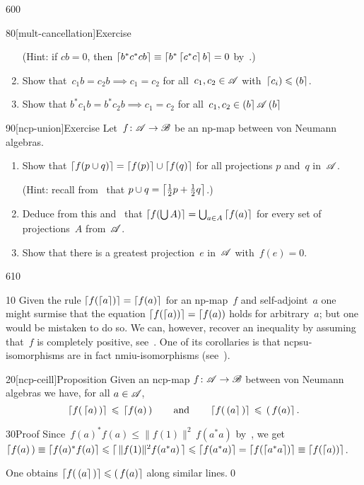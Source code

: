 \begin{parsec}{600}
\begin{point}{80}[mult-cancellation]{Exercise}
\begin{enumerate}
(Hint: if $cb=0$,
then $\left\lceil b^*c^*cb\right\rceil\equiv \left\lceil b^*\left\lceil c^*c\right\rceil b\right\rceil=0$
by~.)
\item
Show that~$c_1b=c_2b \implies c_1=c_2$
for all~$c_1,c_2\in\mathscr{A}$
with~$\left\lceil c_i\right)\leqslant \left(b\right\rceil$.
\item
Show that $b^*c_1b=b^*c_2b\implies c_1=c_2$
for all~$c_1,c_2\in\left(b\right\rceil\mathscr{A}\left(b\right\rceil$
\end{enumerate}
\end{point}
\begin{point}{90}[ncp-union]{Exercise}%
Let~$f\colon \mathscr{A}\to\mathscr{B}$ be an np-map
between von Neumann algebras.
\begin{enumerate}
\item
Show that
$\left\lceil f(p\cup q)\right\rceil
= \left\lceil f(p)\right\rceil\cup\left\lceil f(q)\right\rceil$
for all projections $p$ and~$q$ in~$\mathscr{A}$.

(Hint: recall from~ 
that $p\cup q = \left\lceil\frac{1}{2}p+\frac{1}{2}q\right\rceil$.)

\item
Deduce from this and~ that $\left\lceil f(\bigcup A)\right\rceil=\bigcup_{a\in A}\left\lceil f(a)\right\rceil$
for every set of projections~$A$ from~$\mathscr{A}$.

\item
Show that there is a greatest projection~$e$
in~$\mathscr{A}$ with~$f(e)=0$.
\end{enumerate}
\end{point}
\end{parsec}
\begin{parsec}{610}%
\begin{point}{10}%
Given the rule $\left\lceil f(\left\lceil a\right\rceil)\right\rceil=\left\lceil f(a)\right\rceil$
for an np-map~$f$ and self-adjoint~$a$
one might surmise that
the equation $\left\lceil f(\left\lceil a\right))\right\rceil=\left\lceil f(a)\right)$
holds 
for arbitrary~$a$;
but
one would be mistaken to do so.
We can, however,
recover an inequality
by assuming that~$f$ is completely positive, see~.
One of its corollaries is
that ncpsu-isomorphisms
are in fact nmiu-isomorphisms (see~).
\end{point}
\begin{point}{20}[ncp-ceill]{Proposition}%
Given an ncp-map $f\colon \mathscr{A}\to\mathscr{B}$
between von Neumann algebras
we have,
for all
$a\in\mathscr{A}$,
\begin{equation*}
	\left\lceil f(\,\left\lceil a\right)\,)\right\rceil\,\leqslant\, \left\lceil f(a)\,\right)
	\qquad\text{and}\qquad
	\left\lceil f(\,\left(a\right\rceil\,)\right\rceil\,\leqslant\, \left(\,f(a)\right\rceil.
\end{equation*}
\begin{point}{30}{Proof}
Since~$f(a)^*f(a)\leq \|f(1)\|^2\,f(a^*a)$
 by~,
we get~$\left\lceil f(a)\,\right)\equiv \left\lceil f(a)^*f(a)\right\rceil
	\leqslant \left\lceil\,\smash{\|f(1)\|^2f(a^*a)}\,\right\rceil
	\leqslant \left\lceil f(a^*a)\right\rceil
	=\left\lceil f(\left\lceil a^*a\right\rceil)\right\rceil
	\equiv \left\lceil f(\left\lceil a\right))\right\rceil$.

One obtains $\left\lceil f(\,\left(a\right\rceil\,)\right\rceil\leqslant \left(\,f(a)\right\rceil$
along similar lines.\qed
\end{point}
\end{point}
\end{parsec}%
